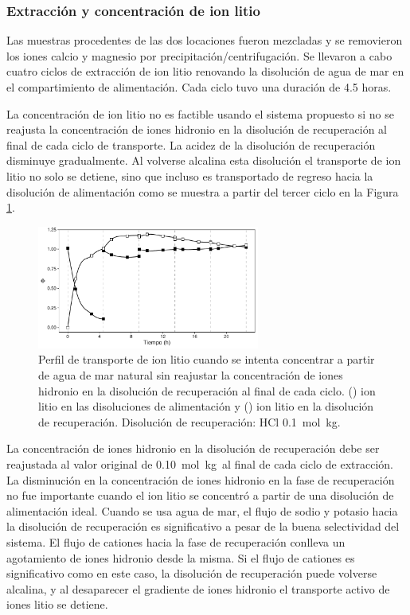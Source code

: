 \subsubsection{Extracción y concentración de ion litio}

Las muestras procedentes de las dos locaciones fueron mezcladas y se removieron los iones calcio y magnesio por precipitación/centrifugación. Se llevaron a cabo cuatro ciclos de extracción de ion litio renovando la disolución de agua de mar en el compartimiento de alimentación. Cada ciclo tuvo una duración de 4.5 horas. 

La concentración de ion litio no es factible usando el sistema propuesto si no se reajusta la concentración de iones hidronio en la disolución de recuperación al final de cada ciclo de transporte. La acidez de la disolución de recuperación disminuye gradualmente. Al volverse alcalina esta disolución el transporte de ion litio no solo se detiene, sino que incluso es transportado de regreso hacia la disolución de alimentación como se muestra a partir del tercer ciclo en la Figura \ref{fig:FAIL}. 

\begin{figure}[H]
    \centering
    \includegraphics[width=0.65\textwidth, trim = {0cm 0 0 0},   clip]{chap5/figures/LiConcAS-FAIL.pdf}
    \caption[Concentración de ion litio sin reajustar la acidez en la fase de recuperación.]{Perfil de transporte de ion litio cuando se intenta concentrar a partir de agua de mar natural sin reajustar la concentración de iones hidronio en la disolución de recuperación al final de cada ciclo. (\protect\squareblck) ion litio en las disoluciones de alimentación y (\protect\squarewht) ion litio en la disolución de recuperación. Disolución de recuperación: HCl 0.1~mol~kg\mnn.}
    \label{fig:FAIL}
\end{figure}

La concentración de iones hidronio en la disolución de recuperación debe ser reajustada al valor original de 0.10~mol~kg\mnn\ al final de cada ciclo de extracción. La disminución en la concentración de iones hidronio en la fase de recuperación no fue importante cuando el ion litio se concentró a partir de una disolución de alimentación ideal. Cuando se usa agua de mar, el flujo de sodio y potasio hacia la disolución de recuperación es significativo a pesar de la buena selectividad del sistema. El flujo de cationes hacia la fase de recuperación conlleva un agotamiento de iones hidronio desde la misma. Si el flujo de cationes es significativo como en este caso, la disolución de recuperación puede volverse alcalina, y al desaparecer el gradiente de iones hidronio el transporte activo de iones litio se detiene. 

